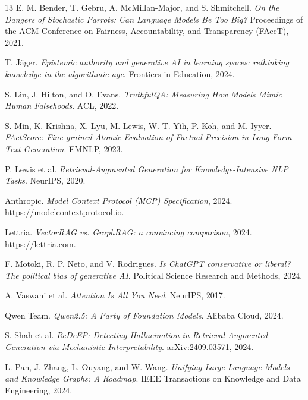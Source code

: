 \documentclass[10pt,a4paper,twocolumn]{article}
\begin{document}
\begin{thebibliography}{13}
E. M. Bender, T. Gebru, A. McMillan-Major, and S. Shmitchell.
\newblock \emph{On the Dangers of Stochastic Parrots: Can Language Models Be Too Big?}
\newblock Proceedings of the ACM Conference on Fairness, Accountability, and Transparency (FAccT), 2021.

T. J\"ager.
\newblock \emph{Epistemic authority and generative AI in learning spaces: rethinking knowledge in the algorithmic age}.
\newblock Frontiers in Education, 2024.

S. Lin, J. Hilton, and O. Evans.
\newblock \emph{TruthfulQA: Measuring How Models Mimic Human Falsehoods}.
\newblock ACL, 2022.

S. Min, K. Krishna, X. Lyu, M. Lewis, W.-T. Yih, P. Koh, and M. Iyyer.
\newblock \emph{FActScore: Fine-grained Atomic Evaluation of Factual Precision in Long Form Text Generation}.
\newblock EMNLP, 2023.

P. Lewis et al.
\newblock \emph{Retrieval-Augmented Generation for Knowledge-Intensive NLP Tasks}.
\newblock NeurIPS, 2020.

Anthropic.
\newblock \emph{Model Context Protocol (MCP) Specification}, 2024.
\newblock \url{https://modelcontextprotocol.io}.

Lettria.
\newblock \emph{VectorRAG vs. GraphRAG: a convincing comparison}, 2024.
\newblock \url{https://lettria.com}.

F. Motoki, R. P. Neto, and V. Rodrigues.
\newblock \emph{Is ChatGPT conservative or liberal? The political bias of generative AI}.
\newblock Political Science Research and Methods, 2024.

A. Vaswani et al.
\newblock \emph{Attention Is All You Need}.
\newblock NeurIPS, 2017.

Qwen Team.
\newblock \emph{Qwen2.5: A Party of Foundation Models}.
\newblock Alibaba Cloud, 2024.

S. Shah et al.
\newblock \emph{ReDeEP: Detecting Hallucination in Retrieval-Augmented Generation via Mechanistic Interpretability}.
\newblock arXiv:2409.03571, 2024.

L. Pan, J. Zhang, L. Ouyang, and W. Wang.
\newblock \emph{Unifying Large Language Models and Knowledge Graphs: A Roadmap}.
\newblock IEEE Transactions on Knowledge and Data Engineering, 2024.
\end{thebibliography}
\end{document}
